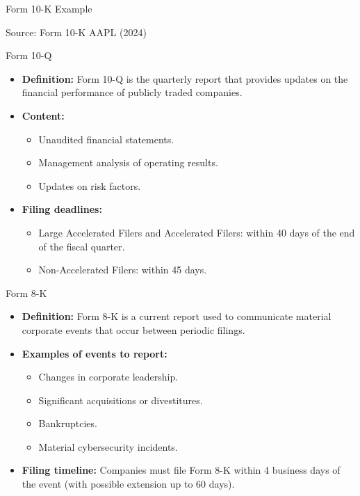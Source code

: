\documentclass{beamer}
\begin{document}
\begin{frame}{Form 10-K Example}
\vspace{2cm}
\begin{center}
\footnotesize{Source: Form 10-K AAPL (2024)}
\end{center}
\end{frame}

\begin{frame}{Form 10-Q}
\begin{itemize}
\item \textbf{Definition:} Form 10-Q is the quarterly report that provides updates on the financial performance of publicly traded companies.
\item \textbf{Content:}
\begin{itemize}
\item Unaudited financial statements.
\item Management analysis of operating results.
\item Updates on risk factors.
\end{itemize}
\item \textbf{Filing deadlines:}
\begin{itemize}
\item Large Accelerated Filers and Accelerated Filers: within 40 days of the end of the fiscal quarter.
\item Non-Accelerated Filers: within 45 days.
\end{itemize}
\end{itemize}
\end{frame}

\begin{frame}{Form 8-K}
\begin{itemize}
\item \textbf{Definition:} Form 8-K is a current report used to communicate material corporate events that occur between periodic filings.
\item \textbf{Examples of events to report:}
\begin{itemize}
\item Changes in corporate leadership.
\item Significant acquisitions or divestitures.
\item Bankruptcies.
\item Material cybersecurity incidents.
\end{itemize}
\item \textbf{Filing timeline:} Companies must file Form 8-K within 4 business days of the event (with possible extension up to 60 days).
\end{itemize}
\end{frame}
\end{document}
